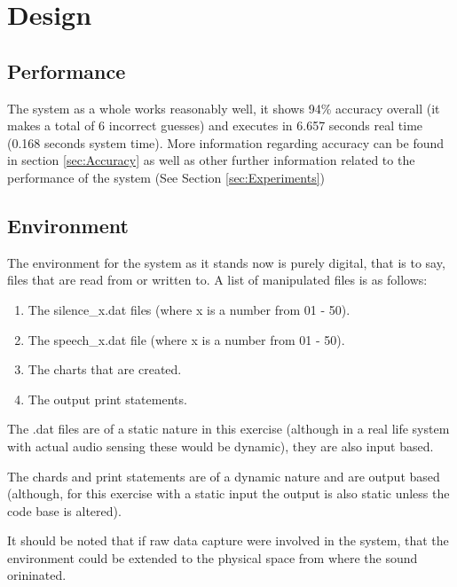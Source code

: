 \documentclass[12pt]{article} %
\begin{document}

\newpage
\tableofcontents %

\newpage
\section{Design}
\subsection{Performance}
The system as a whole works reasonably well, it shows 94\% accuracy overall (it makes a total of 6
incorrect guesses) and executes in 6.657 seconds real time (0.168 seconds system time). More
information regarding accuracy can be found in section \ref{sec:Accuracy} as well as other further
information related to the performance of the system (See Section \ref{sec:Experiments})
 
\subsection{Environment}
The environment for the system as it stands now is purely digital, that is to say, files that are
read from or written to. A list of manipulated files is as follows:
\begin{enumerate}[i]
  \item The silence\_x.dat files (where x is a number from 01 - 50).
  \item The speech\_x.dat file (where x is a number from 01 - 50).
  \item The charts that are created.
  \item The output print statements.
\end{enumerate}

The .dat files are of a static nature in this exercise (although in a real life system with actual
audio sensing these would be dynamic), they are also input based.

The chards and print statements are of a dynamic nature and are output based (although, for this
exercise with a static input the output is also static unless the code base is altered).

It should be noted that if raw data capture were involved in the system, that the environment could
be extended to the physical space from where the sound orininated.
\end{document}
